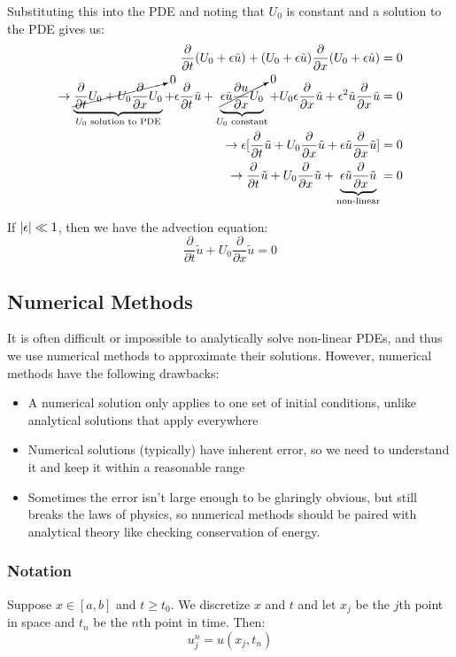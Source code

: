 \documentclass{article}
\begin{document}
Substituting this into the PDE and noting that \(U_0\) is constant and a solution to the PDE gives us:
\begin{align*}
    \frac{\partial}{\partial t}(U_0+\epsilon\tilde{u})+(U_0+\epsilon\tilde{u})\frac{\partial}{\partial x}(U_0+\epsilon\tilde{u})&=0 \\
    \rightarrow \underbrace{\cancelto{0}{\frac{\partial}{\partial t} U_0+U_0\frac{\partial}{\partial x}U_0}}_{U_0 \text{ solution to PDE}}+\epsilon \frac{\partial}{\partial t}\tilde{u}+\underbrace{\cancelto{0}{\epsilon \tilde{u}\frac{\partial u}{\partial x}U_0}}_{U_0 \text{ constant}}+U_0 \epsilon \frac{\partial}{\partial x}\tilde{u}+\epsilon^2 \tilde{u}\frac{\partial}{\partial x}\tilde{u}&=0 \\
    \rightarrow \epsilon[\frac{\partial}{\partial t}\tilde{u}+U_0\frac{\partial}{\partial x}\tilde{u}+\epsilon \tilde{u}\frac{\partial}{\partial x}\tilde{u}]&=0 \\
    \rightarrow \frac{\partial}{\partial t}\tilde{u}+U_0\frac{\partial}{\partial x}\tilde{u}+\underbrace{\epsilon \tilde{u}\frac{\partial}{\partial x}\tilde{u}}_{\text{non-linear}}&=0
\end{align*}

If \(\abs{\epsilon} \ll 1\), then we have the advection equation:
\[
    \frac{\partial}{\partial t}\tilde{u}+U_0\frac{\partial}{\partial x}\tilde{u}=0
\]

\subsection{Numerical Methods}
It is often difficult or impossible to analytically solve non-linear PDEs, and thus we use numerical methods to approximate their solutions. However, numerical methods have the following drawbacks:
\begin{itemize}
    \item A numerical solution only applies to one set of initial conditions, unlike analytical solutions that apply everywhere
    \item Numerical solutions (typically) have inherent error, so we need to understand it and keep it within a reasonable range
    \item Sometimes the error isn't large enough to be glaringly obvious, but still breaks the laws of physics, so numerical methods should be paired with analytical theory like checking conservation of energy.
\end{itemize}

\subsubsection{Notation}
Suppose \(x\in[a,b]\) and \(t\geq t_0\). We discretize \(x\) and \(t\) and let \(x_j\) be the \(j\)th point in space and \(t_n\) be the \(n\)th point in time. Then:
\[
    u_j^n=u(x_j, t_n)
\]       
\end{document}
